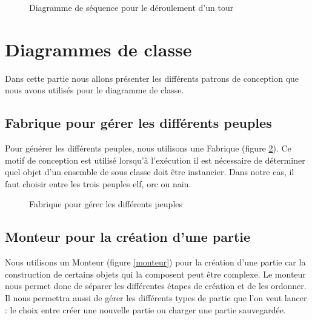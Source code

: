 \documentclass[a4paper]{article}
\begin{document}
\begin{figure}[!h] 
  \begin{center}
    \caption{Diagramme de séquence pour le déroulement d'un tour} 
    \label{sequenceround} 
  \end{center}
\end{figure}

\newpage

\section{Diagrammes de classe}

Dans cette partie nous allons présenter les différents patrons de conception que nous avons utilisés pour le diagramme de classe.

\subsection{Fabrique pour gérer les différents peuples}

Pour générer les différents peuples, nous utilisons une Fabrique (figure \ref{fabrique}). Ce motif de conception est utilisé lorsqu’à l’exécution il est nécessaire de déterminer quel objet d’un ensemble de sous classe doit être instancier. Dans notre cas, il faut choisir entre les trois peuples elf, orc ou nain.

\begin{figure}[!h] 
  \begin{center}
    \caption{Fabrique pour gérer les différents peuples} 
    \label{fabrique} 
  \end{center}
\end{figure}


\subsection{Monteur pour la création d’une partie}

Nous utilisons un Monteur (figure \ref{monteur}) pour la création d’une partie car la construction de certains objets qui la composent peut être complexe. Le monteur nous permet donc de séparer les différentes étapes de création et de les ordonner. Il nous permettra aussi de gérer les différents types de partie que l’on veut lancer : le choix entre créer une nouvelle partie ou charger une partie sauvegardée.
\end{document}
